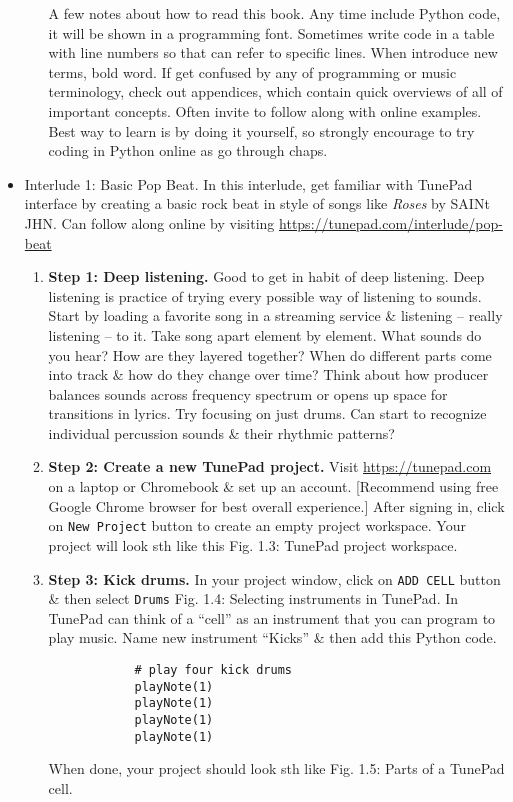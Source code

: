 \documentclass{article}
\begin{document}
\begin{itemize}
\begin{itemize}
		A few notes about how to read this book. Any time include Python code, it will be shown in a programming font. Sometimes write code in a table with line numbers so that can refer to specific lines. When introduce new terms, bold word. If get confused by any of programming or music terminology, check out appendices, which contain quick overviews of all of important concepts. Often invite to follow along with online examples. Best way to learn is by doing it yourself, so strongly encourage to try coding in Python online as go through chaps.
	\end{itemize}
	\item {\sf Interlude 1: Basic Pop Beat.} In this interlude, get familiar with TunePad interface by creating a basic rock beat in style of songs like {\it Roses} by SAINt JHN. Can follow along online by visiting \url{https://tunepad.com/interlude/pop-beat}
	\begin{enumerate}
		\item {\bf Step 1: Deep listening.} Good to get in habit of deep listening. Deep listening is practice of trying every possible way of listening to sounds. Start by loading a favorite song in a streaming service \& listening -- really listening -- to it. Take song apart element by element. What sounds do you hear? How are they layered together? When do different parts come into track \& how do they change over time? Think about how producer balances sounds across frequency spectrum or opens up space for transitions in lyrics. Try focusing on just drums. Can start to recognize individual percussion sounds \& their rhythmic patterns?
		\item {\bf Step 2: Create a new TunePad project.} Visit \url{https://tunepad.com} on a laptop or Chromebook \& set up an account. [Recommend using free Google Chrome browser for best overall experience.] After signing in, click on {\tt New Project} button to create an empty project workspace. Your project will look sth like this {\sf Fig. 1.3: TunePad project workspace}.
		\item {\bf Step 3: Kick drums.} In your project window, click on {\tt ADD CELL} button \& then select {\tt Drums} {\sf Fig. 1.4: Selecting instruments in TunePad.} In TunePad can think of a ``cell'' as an instrument that you can program to play music. Name new instrument ``Kicks'' \& then add this Python code.
		\begin{verbatim}
			# play four kick drums
			playNote(1)
			playNote(1)
			playNote(1)
			playNote(1)
		\end{verbatim}
		When done, your project should look sth like {\sf Fig. 1.5: Parts of a TunePad cell}.
		

\end{enumerate}
\end{itemize}
\end{document}
